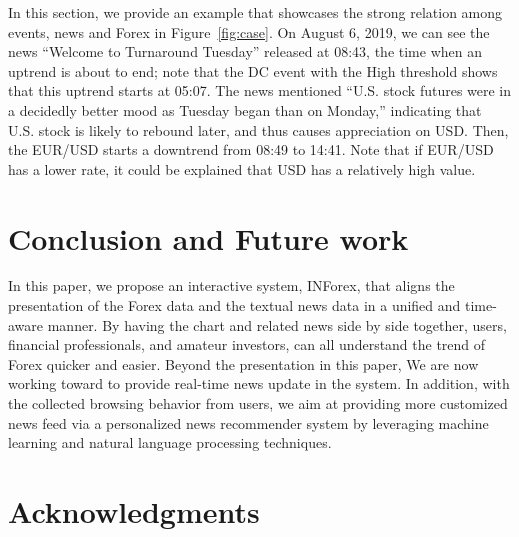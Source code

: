 \documentclass[sigconf]{acmart}
\begin{document}
In this section, we provide an example that showcases the strong relation among events, news and Forex in Figure~\ref{fig:case}.
On August 6, 2019, we can see the news ``Welcome to Turnaround Tuesday'' released at 08:43, the time when an uptrend is about to end; note that the DC event with the High threshold shows that this uptrend starts at 05:07.
The news mentioned ``U.S. stock futures were in a decidedly better mood as Tuesday began than on Monday,'' indicating that U.S. stock is likely to rebound later, and thus causes appreciation on USD.
Then, the EUR/USD starts a downtrend from 08:49 to 14:41.
Note that if EUR/USD has a lower rate, it could be explained that USD has a relatively high value.

\section{Conclusion and Future work}\label{sec:conclude}
In this paper, we propose an interactive system, INForex, that aligns the presentation of the Forex data and the textual news data in a unified and time-aware manner.
By having the chart and related news side by side together, users, financial professionals, and amateur investors, can all understand the trend of Forex quicker and easier.
Beyond the presentation in this paper, We are now working toward to provide real-time news update in the system.
In addition, with the collected browsing behavior from users, we aim at providing more customized news feed via a personalized news recommender system by leveraging machine learning and natural language processing techniques.   

\section{Acknowledgments}





\end{document}
